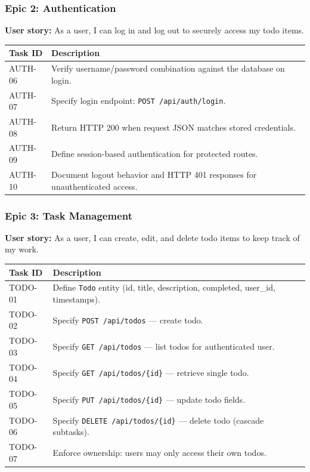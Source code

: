 \subsubsection{Epic 2: Authentication}
\textbf{User story:} As a user, I can log in and log out to securely access my todo items.

\begin{tabularx}{\textwidth}{@{} p{2.4cm} X @{}}
\toprule
\textbf{Task ID} & \textbf{Description} \\
\midrule
AUTH-06 & Verify username/password combination against the database on login. \\
AUTH-07 & Specify login endpoint: \texttt{POST /api/auth/login}. \\
AUTH-08 & Return HTTP 200 when request JSON matches stored credentials. \\
AUTH-09 & Define session-based authentication for protected routes. \\
AUTH-10 & Document logout behavior and HTTP 401 responses for unauthenticated access. \\
\bottomrule
\end{tabularx}

\subsubsection{Epic 3: Task Management}
\textbf{User story:} As a user, I can create, edit, and delete todo items to keep track of my work.

\begin{tabularx}{\textwidth}{@{} p{2.4cm} X @{}}
\toprule
\textbf{Task ID} & \textbf{Description} \\
\midrule
TODO-01 & Define \texttt{Todo} entity (id, title, description, completed, user\_id, timestamps). \\
TODO-02 & Specify \texttt{POST /api/todos} --- create todo. \\
TODO-03 & Specify \texttt{GET /api/todos} --- list todos for authenticated user. \\
TODO-04 & Specify \texttt{GET /api/todos/\{id\}} --- retrieve single todo. \\
TODO-05 & Specify \texttt{PUT /api/todos/\{id\}} --- update todo fields. \\
TODO-06 & Specify \texttt{DELETE /api/todos/\{id\}} --- delete todo (cascade subtasks). \\
TODO-07 & Enforce ownership: users may only access their own todos. \\
\bottomrule
\end{tabularx}

